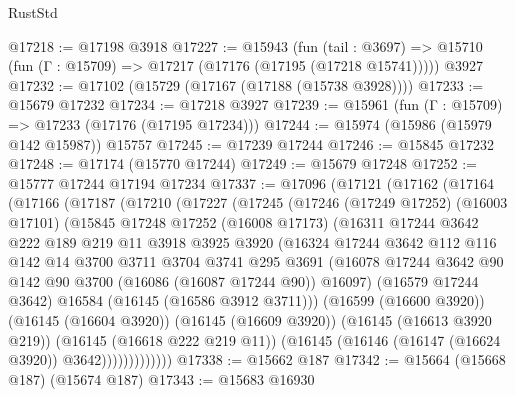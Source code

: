 \begin{lexlean}{RustStd}
\begin{coremodule}
{\begin{coremodule}
{{{{{{{{{{{{{{{{{{{{{{{{{{{{{{{{{{{{{{{{{{{{{{{@17218 := @17198 @3918
@17227 := @15943
    (fun (tail : @3697) => @15710 (fun (Γ : @15709) => @17217 (@17176 (@17195 (@17218 @15741)))))
    @3927
@17232 := @17102 (@15729 (@17167 (@17188 (@15738 @3928))))
@17233 := @15679 @17232
@17234 := @17218 @3927
@17239 := @15961 (fun (Γ : @15709) => @17233 (@17176 (@17195 @17234)))
@17244 := @15974 (@15986 (@15979 @142 @15987)) @15757
@17245 := @17239 @17244
@17246 := @15845 @17232
@17248 := @17174 (@15770 @17244)
@17249 := @15679 @17248
@17252 := @15777 @17244 @17194 @17234
@17337 := @17096
    (@17121
      (@17162
        (@17164
          (@17166
            (@17187
              (@17210
                (@17227
                  (@17245
                    (@17246
                      (@17249 @17252)
                      (@16003 @17101)
                      (@15845
                        @17248
                        @17252
                        (@16008 @17173)
                        (@16311
                          @17244
                          @3642
                          @222
                          @189
                          @219
                          @11
                          @3918
                          @3925
                          @3920
                          (@16324
                            @17244
                            @3642
                            @112
                            @116
                            @142
                            @14
                            @3700
                            @3711
                            @3704
                            @3741
                            @295
                            @3691
                            (@16078
                              @17244
                              @3642
                              @90
                              @142
                              @90
                              @3700
                              (@16086 (@16087 @17244 @90))
                              @16097)
                            (@16579 @17244 @3642)
                            @16584
                            (@16145 (@16586 @3912 @3711)))
                          (@16599 (@16600 @3920))
                          (@16145 (@16604 @3920))
                          (@16145 (@16609 @3920))
                          (@16145 (@16613 @3920 @219))
                          (@16145 (@16618 @222 @219 @11))
                          (@16145 (@16146 (@16147 (@16624 @3920)) @3642)))))))))))))
@17338 := @15662 @187
@17342 := @15664 (@15668 @187) (@15674 @187)
@17343 := @15683 @16930
}}}}}}}}}}}}}}}}}}}}}}}}}}}}}}}}}}}}}}}}}}}}}}}
\end{coremodule}}
\end{coremodule}
\end{lexlean}
